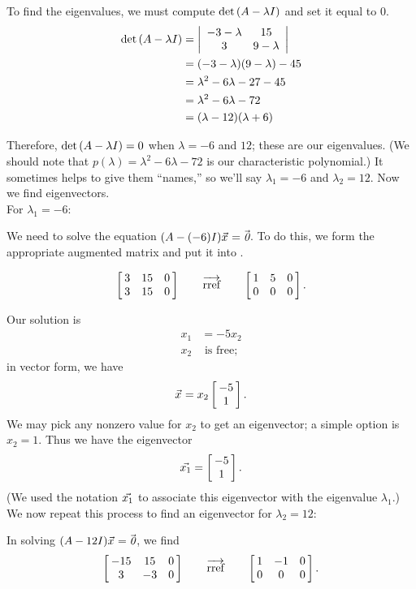 {To find the eigenvalues, we must compute $\det{\tta-\lambda\tti}$ and set it equal to 0. 
\begin{align*}
\det{\tta-\lambda\tti} &= \bdt{cc}-3-\lambda & 15\\3 & 9-\lambda\edt\\
												&= (-3-\lambda)(9-\lambda)-45 \\
												&= \lambda^2-6\lambda-27-45\\
												&= \lambda^2-6\lambda-72\\
												&= (\lambda-12)(\lambda+6)
\end{align*}

Therefore, $\det{\tta-\lambda\tti} = 0$ when $\lambda = -6$ and $12$; these are our eigenvalues. (We should note that $p(\lambda) =\lambda^2-6\lambda-72$ is our characteristic polynomial.) It sometimes helps to give them ``names,'' so we'll say $\lambda_1 = -6$ and $\lambda_2 = 12$. Now we find eigenvectors.\\

For $\lambda_1=-6$:



We need to solve the equation $(\tta - (-6)\tti)\vx = \zero$. To do this, we form the appropriate augmented matrix and put it into \rref.

$$\bmx{ccc}3&15&0\\3&15&0\emx \quad\quad\overrightarrow{\text{rref}}\quad\quad \bmx{ccc}1&5&0\\0&0&0\emx.$$

Our solution is 
\begin{align*}
x_1 &= -5x_2\\
x_2 & \text{ is free;}
\end{align*}
in vector form, we have $$\vx = x_2\bmx{c}-5\\1\emx.$$ We may pick any nonzero value for $x_2$ to get an eigenvector; a simple option is $x_2 = 1$. Thus we have the eigenvector $$\vx[1] = \bmx{c}-5\\1\emx.$$ (We used the notation $\vx[1]$ to associate this eigenvector with the eigenvalue $\lambda_1$.)\\

We now repeat this process to find an eigenvector for $\lambda_2 = 12$:
\drawexampleline%

In solving $(\tta - 12\tti)\vx = \zero$, we find
$$\bmx{ccc}-15 & 15 & 0 \\ 3 & -3 & 0 \emx  \quad\quad\overrightarrow{\text{rref}}\quad\quad \bmx{ccc}1&-1&0\\0&0&0\emx.$$

}
